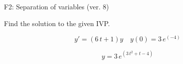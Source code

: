 \begin{exercise}
  \begin{exerciseTitle}F2: Separation of variables (ver. 8)\end{exerciseTitle}
  \begin{exerciseStatement}
    
Find the solution to the given IVP.

    
\[y'=( 6 \, t + 1 )y\hspace{1em} y(0)= 3 \, e^{\left(-4\right)}\]

  \end{exerciseStatement}
  \begin{exerciseAnswer}
    
\[y= 3 \, e^{\left(3 \, t^{2} + t - 4\right)}\]

  \end{exerciseAnswer}
\end{exercise}